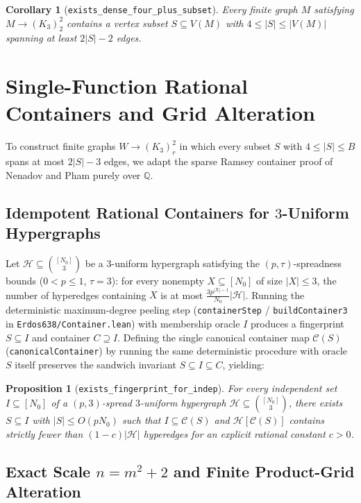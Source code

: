 \documentclass[11pt]{amsart}
\newtheorem{proposition}[theorem]{Proposition}
\newtheorem{corollary}[theorem]{Corollary}
\theoremstyle{definition}
\theoremstyle{remark}
\begin{document}
\begin{corollary}[\texttt{exists\_dense\_four\_plus\_subset}]\label{cor:dense}
Every finite graph $M$ satisfying $M \to (K_3)^2_2$ contains a vertex subset $S \subseteq V(M)$ with $4 \le |S| \le |V(M)|$ spanning at least $2|S| - 2$ edges.
\end{corollary}

\section{Single-Function Rational Containers and Grid Alteration}

To construct finite graphs $W \to (K_3)^2_r$ in which every subset $S$ with $4 \le |S| \le B$ spans at most $2|S| - 3$ edges, we adapt the sparse Ramsey container proof of Nenadov and Pham \cite{NP24} purely over $\mathbb{Q}$.

\subsection{Idempotent Rational Containers for $3$-Uniform Hypergraphs}

Let $\mathcal{H} \subseteq \binom{[N_0]}{3}$ be a $3$-uniform hypergraph satisfying the $(p, \tau)$-spreadness bounds ($0 < p \le 1$, $\tau = 3$): for every nonempty $X \subseteq [N_0]$ of size $|X| \le 3$, the number of hyperedges containing $X$ is at most $\frac{3 p^{|X|-1}}{N_0} |\mathcal{H}|$. Running the deterministic maximum-degree peeling step (\texttt{containerStep} / \texttt{buildContainer3} in \texttt{Erdos638/Container.lean}) with membership oracle $I$ produces a fingerprint $S \subseteq I$ and container $C \supseteq I$. Defining the single canonical container map $\mathcal{C}(S)$ (\texttt{canonicalContainer}) by running the same deterministic procedure with oracle $S$ itself preserves the sandwich invariant $S \subseteq I \subseteq C$, yielding:

\begin{proposition}[\texttt{exists\_fingerprint\_for\_indep}]\label{prop:container}
For every independent set $I \subseteq [N_0]$ of a $(p, 3)$-spread $3$-uniform hypergraph $\mathcal{H} \subseteq \binom{[N_0]}{3}$, there exists $S \subseteq I$ with $|S| \le O(p N_0)$ such that $I \subseteq \mathcal{C}(S)$ and $\mathcal{H}[\mathcal{C}(S)]$ contains strictly fewer than $(1 - c)|\mathcal{H}|$ hyperedges for an explicit rational constant $c > 0$.
\end{proposition}

\subsection{Exact Scale $n = m^2 + 2$ and Finite Product-Grid Alteration}
\end{document}
